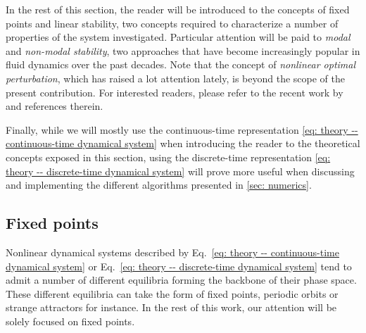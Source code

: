   In the rest of this section, the reader will be introduced to the concepts of fixed points and linear stability, two concepts required to characterize a number of properties of the system investigated. Particular attention will be paid to \emph{modal} and \emph{non-modal stability}, two approaches that have become increasingly popular in fluid dynamics over the past decades. Note that the concept of \emph{nonlinear optimal perturbation}, which has raised a lot attention lately, is beyond the scope of the present contribution. For interested readers, please refer to the recent work by \cite{nonlinear_optimal:kerswell:2014} and references therein.

  Finally, while we will mostly use the continuous-time representation \eqref{eq: theory -- continuous-time dynamical system} when introducing the reader to the theoretical concepts exposed in this section, using the discrete-time representation \eqref{eq: theory -- discrete-time dynamical system} will prove more useful when discussing and implementing the different algorithms presented in \textsection \ref{sec: numerics}.



  \subsection{Fixed points}
  \label{subsec: theory-fixed points}

  Nonlinear dynamical systems described by Eq.~\eqref{eq: theory -- continuous-time dynamical system} or Eq.~\eqref{eq: theory -- discrete-time dynamical system} tend to admit a number of different equilibria forming the backbone of their phase space. These different equilibria can take the form of fixed points, periodic orbits or strange attractors for instance. In the rest of this work, our attention will be solely focused on fixed points.

